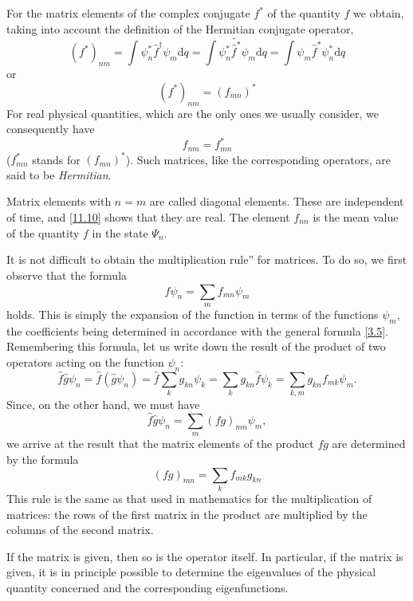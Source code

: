 For the matrix elements of the complex conjugate $ f^* $ of the quantity $ f $ we obtain, taking into account the definition of the Hermitian conjugate operator,
\[ \left(f^*\right)_{nm}=\int\psi_n^*\hat{f}^\dag\psi_m\mathrm{d}q=\int\psi_n^*\tilde{\hat{f}^*}\psi_m\mathrm{d}q=\int\psi_m\hat{f}^*\psi_n^*\mathrm{d}q \]
or
\begin{equation}\label{11.9}
\left( f^*\right)_{nm}=\left(f_{mn}\right)^*
\end{equation}
For real physical quantities, which are the only ones we usually consider, we consequently have
\begin{equation}\label{11.10}
f_{nm}=f_{mn}^*
\end{equation}
($ f_{mn}^* $ stands for $( f_{mn})^* $). Such matrices, like the corresponding operators, are said to be \textit{Hermitian}.

Matrix elements with $ n = m $ are called diagonal elements. These are independent of time, and \eqref{11.10} shows that they are real. The element $ f_{nn} $ is the mean value of the quantity $ f $ in the state $ \Psi_n $.

It is not difficult to obtain the multiplication rule” for matrices. To do so, we first observe that the formula
\begin{equation}\label{11.11}
\hat{f}\psi_n=\sum_{m}f_{mn}\psi_m
\end{equation}
holds. This is simply the expansion of the function in terms of the functions $ \psi_m $, the coefficients being determined in accordance with the general formula \eqref{3.5}. Remembering this formula, let us write down the result of the product of two operators acting on the function $ \psi_n $:
\[ \hat{f}\hat{g}\psi_n=\hat{f}(\hat{g}\psi_n)=\hat{f}\sum_{k}g_{kn}\psi_k=\sum_{k}g_{kn}\hat{f}\psi_k=\sum_{k,m}g_{kn}f_{mk}\psi_m. \]
Since, on the other hand, we must have
\[ \hat{f}\hat{g}\psi_n=\sum_{m}(fg)_{mn}\psi_m, \]
we arrive at the result that the matrix elements of the product $ fg $ are determined by the formula
\begin{equation}\label{11.12}
(fg)_{mn}=\sum_{k}f_{mk}g_{kn}
\end{equation}
This rule is the same as that used in mathematics for the multiplication of matrices: the rows of the first matrix in the product are multiplied by the columns of the second matrix.

If the matrix is given, then so is the operator itself. In particular, if the matrix is given, it is in principle possible to determine the eigenvalues of the physical quantity concerned and the corresponding eigenfunctions.

